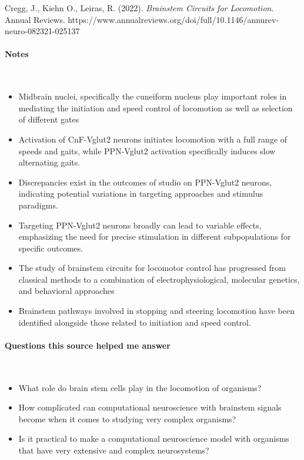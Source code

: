 \begin{hangparas}{.25in}{1}
Cregg, J., Kiehn O., Leiras, R. (2022). \textit{Brainstem Circuits for Locomotion}. Annual Reviews. https://www.annualreviews.org/doi/full/10.1146/annurev-neuro-082321-025137
\end{hangparas}

\vspace*{-0.5cm}
\paragraph{Notes} \

\begin{itemize}
    \item Midbrain nuclei, specifically the cuneiform nucleus play important roles in mediating the initiation and speed control of locomotion as well as selection of different gates 
    \item Activation of CnF-Vglut2 neurons initiates locomotion with a full range of speeds and gaits, while PPN-Vglut2 activation specifically induces slow alternating gaits.
    \item Discrepancies exist in the outcomes of studio on PPN-Vglut2 neurons, indicating potential variations in targeting approaches and stimulus paradigms. 
    \item Targeting PPN-Vglut2 neurons broadly can lead to variable effects, emphasizing the need for precise stimulation in different subpopulations for specific outcomes. 
    \item The study of brainstem circuits for locomotor control has progressed from classical methods to a combination of electrophysiological, molecular genetics, and behavioral approaches 
    \item Brainstem pathways involved in stopping and steering locomotion have been identified alongside those related to initiation and speed control. 
\end{itemize}
    
\vspace*{-0.5cm}
\paragraph{Questions this source helped me answer} \

\begin{itemize}
    \item What role do brain stem cells play in the locomotion of organisms?
    \item How complicated can computational neuroscience with brainstem signals become when it comes to studying very complex organisms?
    \item Is it practical to make a computational neuroscience model with organisms that have very extensive and complex neurosystems? 
\end{itemize}

